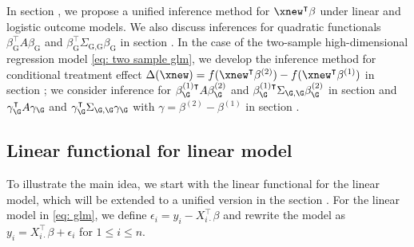 In section , we propose a unified inference method for  $\xnew^\intercal \beta$ under linear and logistic outcome models. 
We also discuss inferences for quadratic functionals $\beta_\mathrm{G}^\intercal A \beta_{\textrm{G}}$ and $\beta_{\textrm{G}}^\intercal \Sigma_{{\textrm{G,G}}} \beta_{\textrm{G}}$ in section . In the case of the two-sample high-dimensional regression model \eqref{eq: two sample glm}, we develop the inference method for conditional treatment effect $\Delta(\xnew) = f(\xnew^{\intercal} \beta^{(2)}) - f(\xnew^{\intercal} \beta^{(1)})$ in section ; we consider inference for $\beta_\G^{(1)\intercal}A\beta_\G^{(2)}$ and $\beta_\G^{(1)\intercal}\Sigma_{\G,\G}\beta_\G^{(2)}$ in section  and 
$\gamma_{\G}^\intercal A \gamma_{\G}$ and $\gamma_{\G}^\intercal \Sigma_{\G,\G} \gamma_{\G}$ with $\gamma = \beta^{(2)} - \beta^{(1)}$ in section .


\subsection{Linear functional for linear model}
\label{subsec: LF-linear}
To illustrate the main idea, we start with the linear functional for the linear model, which will be extended to a unified version in the section . For the linear model in \eqref{eq: glm}, we define $\epsilon_i = y_i - X_{i\cdot}^\intercal \beta$ and rewrite the model as $y_i = X_{i\cdot}^\intercal \beta + \epsilon_i$ for $1\leq i\leq n$. %

